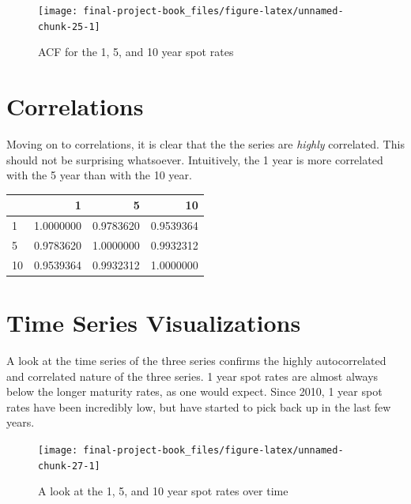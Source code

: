 \documentclass[]{book}
\theoremstyle{definition}
\theoremstyle{definition}
\theoremstyle{definition}
\theoremstyle{remark}
\begin{document}
\begin{figure}

{\centering \texttt{[image: final-project-book\_files/figure-latex/unnamed-chunk-25-1]} 

}

\caption{ACF for the 1, 5, and 10 year spot rates}\label{fig:unnamed-chunk-25}
\end{figure}

\hypertarget{correlations}{%
\section{Correlations}\label{correlations}}

Moving on to correlations, it is clear that the the series are
\emph{highly} correlated. This should not be surprising whatsoever.
Intuitively, the 1 year is more correlated with the 5 year than with the
10 year.

\begin{tabular}{l|r|r|r}
\hline
  & 1 & 5 & 10\\
\hline
1 & 1.0000000 & 0.9783620 & 0.9539364\\
\hline
5 & 0.9783620 & 1.0000000 & 0.9932312\\
\hline
10 & 0.9539364 & 0.9932312 & 1.0000000\\
\hline
\end{tabular}

\hypertarget{time-series-visualizations}{%
\section{Time Series Visualizations}\label{time-series-visualizations}}

A look at the time series of the three series confirms the highly
autocorrelated and correlated nature of the three series. 1 year spot
rates are almost always below the longer maturity rates, as one would
expect. Since 2010, 1 year spot rates have been incredibly low, but have
started to pick back up in the last few years.

\begin{figure}

{\centering \texttt{[image: final-project-book\_files/figure-latex/unnamed-chunk-27-1]} 

}

\caption{A look at the 1, 5, and 10 year spot rates over time}\label{fig:unnamed-chunk-27}
\end{figure}
\end{document}
